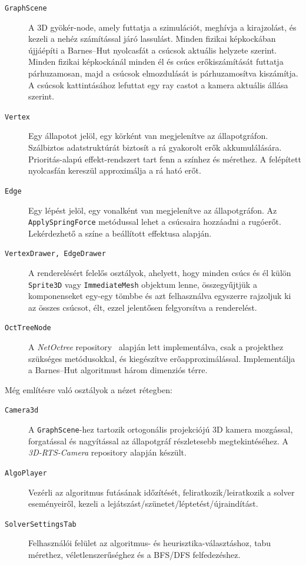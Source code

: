 \begin{description}
    \item[\texttt{GraphScene}] A 3D gyökér-node, amely futtatja a szimulációt, meghívja a kirajzolást, és kezeli a nehéz számítással járó lassulást. Minden fizikai képkockában újjáépíti a Barnes–Hut nyolcasfát a csúcsok aktuális helyzete szerint. Minden fizikai képkockánál minden él és csúcs erőkiszámítását futtatja párhuzamosan, majd a csúcsok elmozdulását is párhuzamosítva kiszámítja. A csúcsok kattintásához lefuttat egy ray castot a kamera aktuális állása szerint.
    \item[\texttt{Vertex}] Egy állapotot jelöl, egy körként van megjelenítve az állapotgráfon. Szálbiztos adatstruktúrát biztosít a rá gyakorolt erők akkumulálására. Prioritás-alapú effekt-rendszert tart fenn a színhez és mérethez. A felépített nyolcasfán kereszül approximálja a rá ható erőt.
    \item[\texttt{Edge}] Egy lépést jelöl, egy vonalként van megjelenítve az állapotgráfon. Az \texttt{ApplySpringForce} metódussal lehet a csúcsaira hozzáadni a rugóerőt. Lekérdezhető a színe a beállított effektusa alapján.
    \item[\texttt{VertexDrawer, EdgeDrawer}] A renderelésért felelős osztályok, ahelyett, hogy minden csúcs és él külön \texttt{Sprite3D} vagy \texttt{ImmediateMesh} objektum lenne, összegyűjtjük a komponenseket egy-egy tömbbe és azt felhasználva egyszerre rajzoljuk ki az összes csúcsot, élt, ezzel jelentősen felgyorsítva a renderelést.
    \item[\texttt{OctTreeNode}] A \textit{NetOctree} repository~\cite{octree_mcserep} alapján lett implementálva, csak a projekthez szükséges metódusokkal, és kiegészítve erőapproximálással. Implementálja a Barnes–Hut algoritmust három dimenziós térre.
\end{description}


Még említésre való osztályok a nézet rétegben:
\begin{description}
\item[\texttt{Camera3d}] A \texttt{GraphScene}-hez tartozik ortogonális projekciójú 3D kamera mozgással, forgatással és nagyítással az állapotgráf részletesebb megtekintéséhez. A \textit{3D-RTS-Camera} repository alapján készült. ~\cite{3d_rts_camera}
\item[\texttt{AlgoPlayer}] Vezérli az algoritmus futásának időzítését, feliratkozik/leiratkozik a solver eseményeiről, kezeli a lejátszást/szünetet/léptetést/újraindítást.
\item[\texttt{SolverSettingsTab}] Felhasználói felület az algoritmus- és heurisztika-választáshoz, tabu mérethez, véletlenszerűséghez és a BFS/DFS felfedezéshez.

\end{description}

